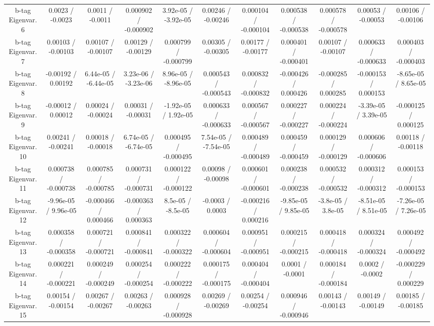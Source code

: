 \begin{table}[htbp]
\begin{center}
\begin{tabular}{|c|c|c|c|c|c|c|c|c|c|c|}
  b-tag Eigenvar. 6 & 0.0023 / -0.0023 & 0.0011 / -0.0011 & 0.000902 / -0.000902 & 3.92e-05 / -3.92e-05 & 0.00246 / -0.00246 & 0.000104 / -0.000104 & 0.000538 / -0.000538 & 0.000578 / -0.000578 & 0.00053 / -0.00053 & 0.00106 / -0.00106 \\ 
  b-tag Eigenvar. 7 & 0.00103 / -0.00103 & 0.00107 / -0.00107 & 0.00129 / -0.00129 & 0.000799 / -0.000799 & 0.00305 / -0.00305 & 0.00177 / -0.00177 & 0.000401 / -0.000401 & 0.00107 / -0.00107 & 0.000633 / -0.000633 & 0.000403 / -0.000403 \\ 
  b-tag Eigenvar. 8 & -0.00192 / 0.00192 & 6.44e-05 / -6.44e-05 & 3.23e-06 / -3.23e-06 & 8.96e-05 / -8.96e-05 & 0.000543 / -0.000543 & 0.000832 / -0.000832 & -0.000426 / 0.000426 & -0.000285 / 0.000285 & -0.000153 / 0.000153 & -8.65e-05 / 8.65e-05 \\ 
  b-tag Eigenvar. 9 & -0.00012 / 0.00012 & 0.00024 / -0.00024 & 0.00031 / -0.00031 & -1.92e-05 / 1.92e-05 & 0.000633 / -0.000633 & 0.000567 / -0.000567 & 0.000227 / -0.000227 & 0.000224 / -0.000224 & -3.39e-05 / 3.39e-05 & -0.000125 / 0.000125 \\ 
  b-tag Eigenvar. 10 & 0.00241 / -0.00241 & 0.00018 / -0.00018 & 6.74e-05 / -6.74e-05 & 0.000495 / -0.000495 & 7.54e-05 / -7.54e-05 & 0.000489 / -0.000489 & 0.000459 / -0.000459 & 0.000129 / -0.000129 & 0.000606 / -0.000606 & 0.00118 / -0.00118 \\ 
  b-tag Eigenvar. 11 & 0.000738 / -0.000738 & 0.000785 / -0.000785 & 0.000731 / -0.000731 & 0.000122 / -0.000122 & 0.00098 / -0.00098 & 0.000601 / -0.000601 & 0.000238 / -0.000238 & 0.000532 / -0.000532 & 0.000312 / -0.000312 & 0.000153 / -0.000153 \\ 
  b-tag Eigenvar. 12 & -9.96e-05 / 9.96e-05 & -0.000466 / 0.000466 & -0.000363 / 0.000363 & 8.5e-05 / -8.5e-05 & -0.0003 / 0.0003 & -0.000216 / 0.000216 & -9.85e-05 / 9.85e-05 & -3.8e-05 / 3.8e-05 & -8.51e-05 / 8.51e-05 & -7.26e-05 / 7.26e-05 \\ 
  b-tag Eigenvar. 13 & 0.000358 / -0.000358 & 0.000721 / -0.000721 & 0.000841 / -0.000841 & 0.000322 / -0.000322 & 0.000604 / -0.000604 & 0.000951 / -0.000951 & 0.000215 / -0.000215 & 0.000418 / -0.000418 & 0.000324 / -0.000324 & 0.000492 / -0.000492 \\ 
  b-tag Eigenvar. 14 & 0.000221 / -0.000221 & 0.000249 / -0.000249 & 0.000254 / -0.000254 & 0.000222 / -0.000222 & 0.000175 / -0.000175 & 0.000404 / -0.000404 & 0.0001 / -0.0001 & 0.000184 / -0.000184 & 0.0002 / -0.0002 & -0.000229 / 0.000229 \\ 
  b-tag Eigenvar. 15 & 0.00154 / -0.00154 & 0.00267 / -0.00267 & 0.00263 / -0.00263 & 0.000928 / -0.000928 & 0.00269 / -0.00269 & 0.00254 / -0.00254 & 0.000946 / -0.000946 & 0.00143 / -0.00143 & 0.00149 / -0.00149 & 0.00185 / -0.00185 \\ 

\end{tabular}
\end{center}
\end{table}
